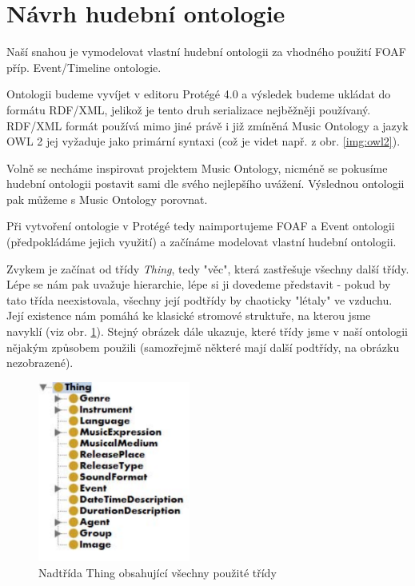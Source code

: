 \section{Návrh hudební ontologie}

Naší snahou je vymodelovat vlastní hudební ontologii za vhodného použití FOAF příp. Event/Timeline ontologie.

Ontologii budeme vyvíjet v editoru Protégé 4.0 a výsledek budeme ukládat do formátu RDF/XML, jelikož je tento druh serializace nejběžněji používaný. RDF/XML formát používá mimo jiné právě i již zmíněná Music Ontology a jazyk OWL 2 jej vyžaduje jako primární syntaxi (což je videt např. z obr. \ref{img:owl2}).

Volně se necháme inspirovat projektem Music Ontology, nicméně se pokusíme hudební ontologii postavit sami dle svého nejlepšího uvážení. 
Výslednou ontologii pak můžeme s Music Ontology porovnat.

Při vytvoření ontologie v Protégé tedy naimportujeme FOAF a Event ontologii (předpokládáme jejich využití) a začínáme modelovat vlastní hudební ontologii.

Zvykem je začínat od třídy \textit{Thing}, tedy "věc", která zastřešuje všechny další třídy. Lépe se nám pak uvažuje hierarchie, lépe si ji dovedeme představit - pokud by tato třída neexistovala, všechny její podtřídy by chaoticky "létaly" ve vzduchu. Její existence nám pomáhá ke klasické stromové struktuře, na kterou jsme navyklí (viz obr. \ref{img:thing2}). Stejný obrázek dále ukazuje, které třídy jsme v naší ontologii nějakým způsobem použili (samozřejmě některé mají další podtřídy, na obrázku nezobrazené).

\begin{figure}[h]
\begin{center}
\includegraphics[width=5cm]{figures/thing2}
\caption{Nadtřída Thing obsahující všechny použité třídy}
\label{img:thing2}
\end{center}
\end{figure}

